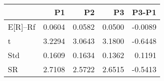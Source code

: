 \begin{tabular}{lrrrr}
\toprule
 & P1 & P2 & P3 & P3-P1 \\
\midrule
E[R]--Rf & 0.0604 & 0.0582 & 0.0500 & -0.0089 \\
t & 3.2294 & 3.0643 & 3.1800 & -0.6448 \\
Std & 0.1609 & 0.1634 & 0.1362 & 0.1191 \\
SR & 2.7108 & 2.5722 & 2.6515 & -0.5413 \\
\bottomrule
\end{tabular}
